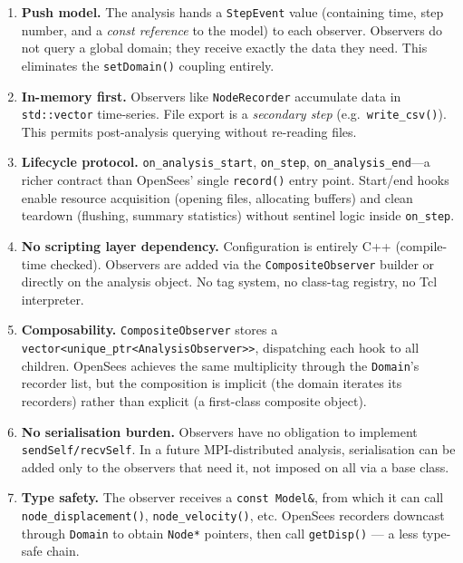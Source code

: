 \begin{enumerate}
  \item \textbf{Push model.}  The analysis hands a
        \texttt{StepEvent} value (containing time, step number, and
        a \emph{const reference} to the model) to each observer.
        Observers do not query a global domain; they receive exactly
        the data they need.  This eliminates the
        \texttt{setDomain()} coupling entirely.

  \item \textbf{In-memory first.}  Observers like
        \texttt{NodeRecorder} accumulate data in
        \texttt{std::vector} time-series.  File export is a
        \emph{secondary step} (e.g.\ \texttt{write\_csv()}).
        This permits post-analysis querying without re-reading files.

  \item \textbf{Lifecycle protocol.}
        \texttt{on\_analysis\_start}, \texttt{on\_step},
        \texttt{on\_analysis\_end}---a richer contract than OpenSees'
        single \texttt{record()} entry point.  Start/end hooks enable
        resource acquisition (opening files, allocating buffers) and
        clean teardown (flushing, summary statistics) without
        sentinel logic inside \texttt{on\_step}.

  \item \textbf{No scripting layer dependency.}  Configuration is
        entirely C++ (compile-time checked).  Observers are added via
        the \texttt{CompositeObserver} builder or directly on the
        analysis object.  No tag system, no class-tag registry, no
        Tcl interpreter.

  \item \textbf{Composability.}  \texttt{CompositeObserver} stores a
        \texttt{vector<unique\_ptr<AnalysisObserver>>}, dispatching
        each hook to all children.  OpenSees achieves the same
        multiplicity through the \texttt{Domain}'s recorder list,
        but the composition is implicit (the domain iterates its
        recorders) rather than explicit (a first-class composite
        object).

  \item \textbf{No serialisation burden.}  Observers have no
        obligation to implement \texttt{sendSelf/recvSelf}.  In a
        future MPI-distributed analysis, serialisation can be added
        only to the observers that need it, not imposed on all via
        a base class.

  \item \textbf{Type safety.}  The observer receives a
        \texttt{const Model\&}, from which it can call
        \texttt{node\_displacement()}, \texttt{node\_velocity()}, etc.
        OpenSees recorders downcast through \texttt{Domain} to
        obtain \texttt{Node*} pointers, then call
        \texttt{getDisp()} --- a less type-safe chain.
\end{enumerate}

